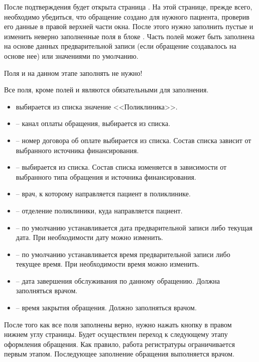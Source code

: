 {После подтверждения будет открыта страница . На этой странице, прежде всего, необходимо убедиться, что обращение создано для нужного пациента, проверив его данные в правой верхней части окна. После этого нужно заполнить пустые и изменить неверно заполненные поля в блоке . Часть полей может быть заполнена на основе данных предварительной записи (если обращение создавалось на основе нее) или значениями по умолчанию.

\begin{vnim}
 Поля  и  на данном этапе заполнять не нужно!
\end{vnim}

Все поля, кроме полей  и  являются обязательными для заполнения.
\begin{itemize}
 \item {} выбирается из списка значение <<Поликлиника>>.
 \item {} – канал оплаты обращения, выбирается из списка.
 \item {} – номер договора об оплате выбирается из списка. Состав списка зависит от выбранного источника финансирования.
 \item {} – выбирается из списка. Состав списка изменяется в зависимости от выбранного типа обращения и источника финансирования.
 \item {} – врач, к которому направляется пациент в поликлинике.
 \item {} – отделение поликлиники, куда направляется пациент.
 \item {} – по умолчанию устанавливается дата предварительной записи либо текущая дата. При необходимости дату можно изменить.
 \item {} – по умолчанию устанавливается время предварительной записи либо текущее время. При необходимости время можно изменить.
 \item {} – дата завершения обслуживания по данному обращению. Должна заполняться врачом.
 \item {} – время закрытия обращения. Должно заполняться врачом.
\end{itemize}

После того как все поля заполнены верно, нужно нажать кнопку  в правом нижнем углу страницы. Будет осуществлен переход к следующему этапу оформления обращения. Как правило, работа регистратуры ограничивается первым этапом. Последующее заполнение обращения выполняется врачом.

}
